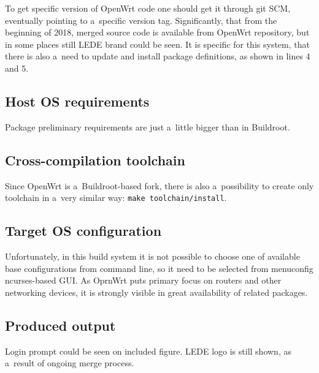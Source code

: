 \documentclass[printmode]{mgr}
\begin{document}
To get specific version of OpenWrt code one should get it through git SCM, eventually pointing to a~specific version tag.
Significantly, that from the beginning of 2018, merged source code is available from OpenWrt repository, but in some places still LEDE brand could be seen.
It is specific for this system, that there is also a~need to update and install package definitions, as shown in lines 4 and 5.

\subsection*{Host OS requirements}

Package preliminary requirements are just a~little bigger than in Buildroot.

\subsection*{Cross-compilation toolchain}

Since OpenWrt is a~Buildroot-based fork, there is also a~possibility to create only toolchain in a~very similar way: \verb|make toolchain/install|.

\subsection*{Target OS configuration}

Unfortunately, in this build system it is not possible to choose one of available base configurations from command line, so it need to be selected from menuconfig ncurses-based GUI.
As OprnWrt puts primary focus on routers and other networking devices, it is strongly visible in great availability of related packages.

\subsection*{Produced output}

Login prompt could be seen on included figure.
LEDE logo is still shown, as a~result of ongoing merge process.
\end{document}
